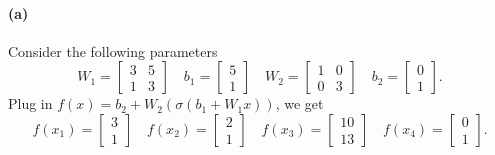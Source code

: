 \documentclass[12pt]{article}
\begin{document}
\paragraph{(a)}
Consider the following parameters
\[ W_1=\begin{bmatrix} 3 & 5 \\ 1 & 3 \end{bmatrix} \hspace{1em}
   b_1=\begin{bmatrix} 5 \\ 1 \end{bmatrix} \hspace{1em}
   W_2=\begin{bmatrix} 1 & 0 \\ 0 & 3 \end{bmatrix} \hspace{1em}
   b_2=\begin{bmatrix} 0 \\ 1 \end{bmatrix}. \]
Plug in \(f(x)=b_2+W_2\left(\sigma(b_1+W_1 x) \right)\), we get
\[ f(x_1)=\begin{bmatrix} 3 \\ 1 \end{bmatrix} \hspace{1em}
   f(x_2)=\begin{bmatrix} 2 \\ 1 \end{bmatrix} \hspace{1em}
   f(x_3)=\begin{bmatrix} 10 \\ 13 \end{bmatrix} \hspace{1em}
   f(x_4)=\begin{bmatrix} 0 \\ 1 \end{bmatrix}. \]
\end{document}
